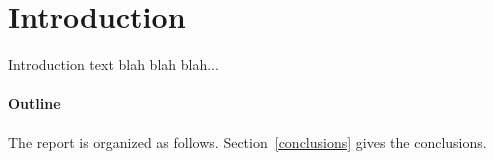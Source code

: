 \section{Introduction}
Introduction text blah blah blah...

\paragraph{Outline}
The report is organized as follows.
Section~\ref{conclusions} gives the conclusions\cite{Gil:02}.

